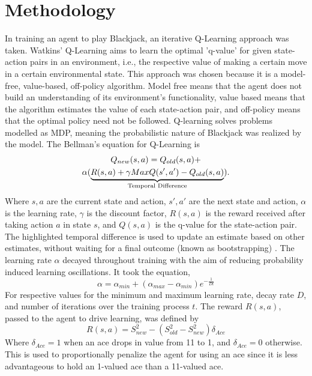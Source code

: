 \section{Methodology}

In training an agent to play Blackjack, an iterative Q-Learning approach was taken. Watkins' Q-Learning aims to learn the optimal 'q-value' for given state-action pairs in an environment, i.e., the respective value of making a certain move in a certain environmental state. This approach was chosen because it is a model-free, value-based, off-policy algorithm. Model free means that the agent does not build an understanding of its environment's functionality, value based means that the algorithm estimates the value of each state-action pair, and off-policy means that the optimal policy need not be followed. Q-learning solves problems modelled as MDP, meaning the probabilistic nature of Blackjack was realized by the model. The Bellman's equation for Q-Learning is
\begin{multline} \label{eq:Bellman}
    Q_{new}(s,a)=Q_{old}(s,a)+\\\alpha(\underbrace{R(s,a)+\gamma MaxQ(s',a')-Q_{old}(s,a)}_{\mathclap{\text{Temporal Difference}}})\text{.}
\end{multline}
Where \( s, a \) are the current state and action,  \( s', a' \) are the next state and action, \( \alpha \) is the learning rate, \( \gamma \) is the discount factor, \( R(s,a) \) is the reward received after taking action \( a \) in state \( s \), and \( Q(s,a) \) is the q-value for the state-action pair. The highlighted temporal difference is used to update an estimate based on other estimates, without waiting for a final outcome (known as bootstrapping) \cite{10.5555/3312046}. The learning rate \(\alpha\) decayed throughout training with the aim of reducing probability induced learning oscillations. It took the equation, 
\begin{equation} \label{eq:learning rate}
    \alpha = \alpha_{min} + (\alpha_{max} - \alpha_{min})e^{-\frac{1}{Dt}}
\end{equation}
For respective values for the minimum and maximum learning rate, decay rate \(D\), and number of iterations over the training process \(t\). The reward \(R(s,a)\), passed to the agent to drive learning, was defined by
\begin{equation} \label{reward}
    R(s,a) = S_{new}^2 - (S_{old}^2 - S_{new}^2)\delta_{Ace}
\end{equation}
Where \(\delta_{Ace}=1\) when an ace drops in value from 11 to 1, and \(\delta_{Ace}=0\) otherwise. This is used to proportionally penalize the agent for using an ace since it is less advantageous to hold an 1-valued ace than a 11-valued ace.


